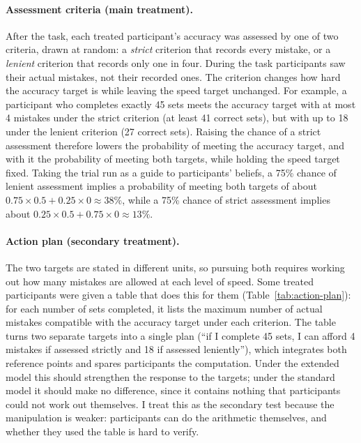 \documentclass[12pt, letterpaper]{article}
\begin{document}
\paragraph{Assessment criteria (main treatment).} After the task, each treated participant's accuracy was assessed by one of two criteria, drawn at random: a \emph{strict} criterion that records every mistake, or a \emph{lenient} criterion that records only one in four. During the task participants saw their actual mistakes, not their recorded ones. The criterion changes how hard the accuracy target is while leaving the speed target unchanged. For example, a participant who completes exactly 45 sets meets the accuracy target with at most 4 mistakes under the strict criterion (at least 41 correct sets), but with up to 18 under the lenient criterion (27 correct sets). Raising the chance of a strict assessment therefore lowers the probability of meeting the accuracy target, and with it the probability of meeting both targets, while holding the speed target fixed. Taking the trial run as a guide to participants' beliefs, a 75\% chance of lenient assessment implies a probability of meeting both targets of about $0.75 \times 0.5 + 0.25 \times 0 \approx 38\%$, while a 75\% chance of strict assessment implies about $0.25 \times 0.5 + 0.75 \times 0 \approx 13\%$.

\paragraph{Action plan (secondary treatment).} The two targets are stated in different units, so pursuing both requires working out how many mistakes are allowed at each level of speed. Some treated participants were given a table that does this for them (Table~\ref{tab:action-plan}): for each number of sets completed, it lists the maximum number of actual mistakes compatible with the accuracy target under each criterion. The table turns two separate targets into a single plan (``if I complete 45 sets, I can afford 4 mistakes if assessed strictly and 18 if assessed leniently''), which integrates both reference points and spares participants the computation. Under the extended model this should strengthen the response to the targets; under the standard model it should make no difference, since it contains nothing that participants could not work out themselves. I treat this as the secondary test because the manipulation is weaker: participants can do the arithmetic themselves, and whether they used the table is hard to verify.
\end{document}
